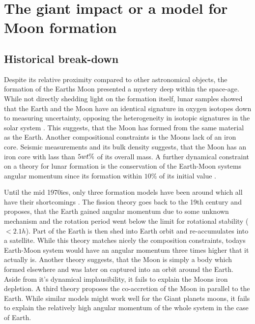 \chapter{The giant impact or a model for Moon formation}
\label{ch05}
\graphicspath{{./05figs/}}





\section{Historical break-down}
Despite its relative proximity compared to other astronomical objects, the formation of the Earths Moon presented a mystery deep within the space-age. While not directly shedding light on the formation itself, lunar samples showed that the Earth and the Moon have an identical signature in oxygen isotopes down to measuring uncertainty, opposing the heterogeneity in isotopic signatures in the solar system \citep{Wiechert:2001p3543}. This suggests, that the Moon has formed from the same material as the Earth. Another compositional constraints is the Moons lack of an iron core. Seismic measurements and its bulk density suggests, that the Moon has an iron core with lass than $5 wt\mathrm{\%}$ \citep{2011Sci...331..309W} of its overall mass. A further dynamical constraint on a theory for lunar formation is the conservation of the Earth-Moon systems angular momentum since its formation within $10\%$ of its initial value \citep{Canup:2001p3295}. 

Until the mid 1970ies, only three formation models have been around which all have their shortcomings \citep{Stevenson:1987p3540}. The fission theory goes back to the 19th century and proposes, that the Earth gained angular momentum due to some unknown mechanism and the rotation period went below the limit for rotational stability ($< 2.1h$). Part of the Earth is then shed into Earth orbit and re-accumulates into a satellite. While this theory matches nicely the composition constraints, todays Earth-Moon system would have an angular momentum three times higher that it actually is. Another theory suggests, that the Moon is simply a body which formed elsewhere and was later on captured into an orbit around the Earth. Aside from it's dynamical implausibility, it fails to explain the Moons iron depletion. A third theory proposes the co-accretion of the Moon in parallel to the Earth. While similar models might work well for the Giant planets moons, it fails to explain the relatively high angular momentum of the whole system in the case of Earth.

